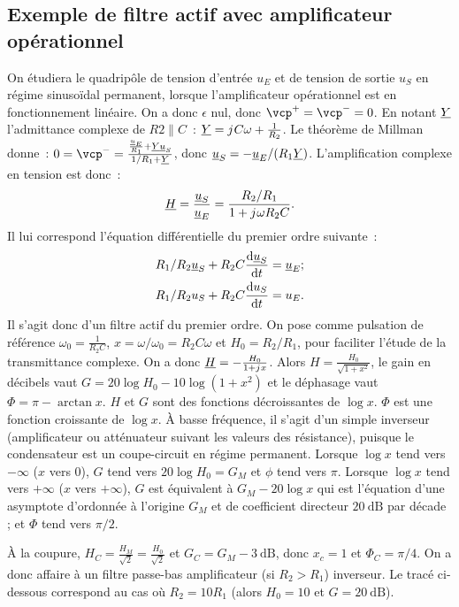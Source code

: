 \subsection{Exemple de filtre actif avec amplificateur opérationnel}
On étudiera le quadripôle de tension d'entrée $u_E$ et de tension de sortie $u_S$ en régime sinusoïdal permanent, lorsque l'amplificateur opérationnel est en fonctionnement linéaire. On a donc $\epsilon$ nul, donc $\vcp^+=\vcp^-=0$. En notant $\underline{Y}$ l'admittance complexe de $R2 \parallel C$~: $\underline{Y} = {j\mkern1mu} C \omega + \frac{1}{R_2}$. Le théorème de Millman donne~: $0=\vcp^-=\frac{\frac{\uc_E}{R_1}+\Yc \uc_S}{1/R_1+\Yc}$, donc $\underline{u}_S = -\underline{u}_E/(R_1 \underline{Y})$. L'amplification complexe en tension est donc~:
\begin{equation}
	\underline{H} = \frac{\underline{u}_S}{\underline{u}_E} = \frac{R_2/R_1}{1+{j\mkern1mu}\omega R_2 C}.
\end{equation}
Il lui correspond l'équation différentielle du premier ordre suivante~:
\begin{align}
	R_1/R_2 \underline{u}_S + R_2C \dfrac{\mathrm{d} \underline{u}_S}{\mathrm{d} t} &= \underline{u}_E; \\
	R_1/R_2 u_S + R_2C \dfrac{\mathrm{d} u_S}{\mathrm{d} t} &= u_E. 
\end{align}
Il s'agit donc d'un filtre actif du premier ordre. On pose comme pulsation de référence $\omega_0 = \frac{1}{R_2C}$, $x = \omega/\omega_0 = R_2C \omega$ et $H_0 = R_2/R_1$, pour faciliter l'étude de la transmittance complexe. On a donc $\underline{H} = -\frac{H_0}{1+{j\mkern1mu} x}$. Alors $H = \frac{H_0}{\sqrt{1+x^2}}$, le gain en décibels vaut $G = 20\log H_0 - 10 \log(1+x^2)$ et le déphasage vaut $\Phi = \pi - \arctan x$. $H$ et $G$ sont des fonctions décroissantes de $\log x$. $\Phi$ est une fonction croissante de $\log x$. À basse fréquence, il s'agit d'un simple inverseur (amplificateur ou atténuateur suivant les valeurs des résistance), puisque le condensateur est un coupe-circuit en régime permanent. Lorsque $\log x$ tend vers $-\infty$ ($x$ vers 0), $G$ tend vers $20\log H_0 = G_M$ et $\phi$ tend vers $\pi$. Lorsque $\log x$ tend vers $+\infty$ ($x$ vers $+\infty$), $G$ est équivalent à $G_M - 20\log x$ qui est l'équation d'une asymptote d'ordonnée à l'origine $G_M$ et de coefficient directeur $\SI{20}{\dB}$ par décade ; et $\Phi$ tend vers $\pi/2$.

À la coupure, $H_C = \frac{H_M}{\sqrt{2}} = \frac{H_0}{\sqrt{2}}$ et $G_C = G_M -\SI{3}{\dB}$, donc $x_c=1$ et $\Phi_C = \pi/4$. On a donc affaire à un filtre passe-bas amplificateur (si $R_2>R_1$) inverseur. Le tracé ci-dessous correspond au cas où $R_2=10R_1$ (alors $H_0=10$ et $G = \SI{20}{\dB}$).

